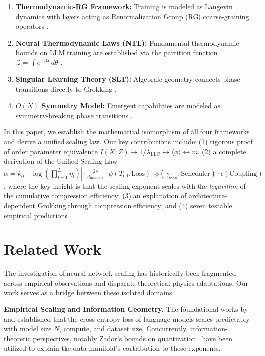 \documentclass[11pt, a4paper]{article}
\theoremstyle{plain}
\def\sL{{\mathcal L}}
\def\sZ{{\mathcal Z}}
\begin{document}
\begin{enumerate}
    \item \textbf{Thermodynamic-RG Framework:} Training is modeled as Langevin dynamics with layers acting as Renormalization Group (RG) coarse-graining operators \citep{mehta2006renormalization}.
    \item \textbf{Neural Thermodynamic Laws (NTL):} Fundamental thermodynamic bounds on LLM training are established via the partition function $\sZ = \int e^{-\beta\sL}d\theta$ \citep{tegmark2505.10559}.
    \item \textbf{Singular Learning Theory (SLT):} Algebraic geometry connects phase transitions directly to Grokking \citep{watanabe2007singular,watanabe2009algebraic,michaud2023quantization}.
    \item \textbf{$O(N)$ Symmetry Model:} Emergent capabilities are modeled as symmetry-breaking phase transitions \citep{wei2022phase,chae2024phase}.
\end{enumerate}

In this paper, we establish the mathematical isomorphism of all four frameworks and derive a unified scaling law. Our key contributions include: (1) rigorous proof of order parameter equivalence $I(X;Z) \leftrightarrow 1/\lambda_{\text{LLC}} \leftrightarrow \langle\phi\rangle \leftrightarrow m$; (2) a complete derivation of the Unified Scaling Law $\alpha = k_\alpha \cdot |\log(\prod_{l=1}^{L}\eta_l)| \cdot \frac{2s}{d_{\text{manifold}}} \cdot \psi(T_{\text{eff}},\text{Loss})\cdot\phi(\gamma_{\text{cool}},\text{Scheduler})\cdot\epsilon(\text{Coupling})$, where the key insight is that the scaling exponent scales with the \emph{logarithm} of the cumulative compression efficiency; (3) an explanation of architecture-dependent Grokking through compression efficiency; and (4) seven testable empirical predictions.

\section{Related Work}

The investigation of neural network scaling has historically been fragmented across empirical observations and disparate theoretical physics adaptations. Our work serves as a bridge between these isolated domains.

\textbf{Empirical Scaling and Information Geometry.} The foundational works by \citet{kaplan2020scaling} and \citet{hoffmann2022training} established that the cross-entropy loss of language models scales predictably with model size $N$, compute, and dataset size. Concurrently, information-theoretic perspectives, notably Zador's bounds on quantization \citep{zador1982asymptotic}, have been utilized to explain the data manifold's contribution to these exponents.
\end{document}
